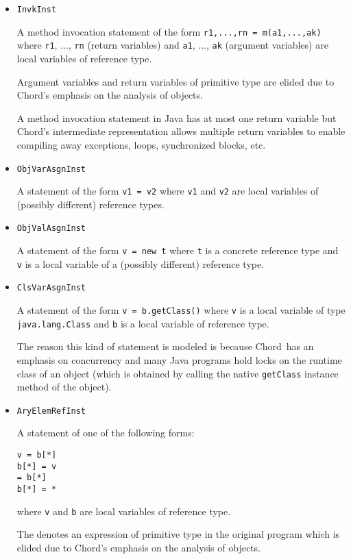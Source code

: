 \documentclass{article}
\providecommand\Chord{{Chord}}
\begin{document}
\begin{itemize}
\item
{\tt InvkInst}

A method invocation statement of the form
{\tt r1,...,rn = m(a1,...,ak)} where
{\tt r1}, ..., {\tt rn} (return variables) and
{\tt a1}, ..., {\tt ak} (argument variables)
are local variables of reference type.

Argument variables and return variables of primitive type are
elided due to \Chord's emphasis on the analysis of objects.

A method invocation statement in Java has at most
one return variable but
\Chord's intermediate representation allows multiple return variables
to enable compiling away exceptions, loops, synchronized blocks, etc.

\item
{\tt ObjVarAsgnInst}

A statement of the form {\tt v1 = v2} where {\tt v1}
and {\tt v2} are local variables of (possibly different) reference types.

\item
{\tt ObjValAsgnInst}

A statement of the form {\tt v = new t} where {\tt t} is a
concrete reference type and
{\tt v} is a local variable of a (possibly different) reference type.

\item
{\tt ClsVarAsgnInst}

A statement of the form {\tt v = b.getClass()} where
{\tt v} is a local variable of type {\tt java.lang.Class}
and {\tt b} is a local variable of reference type.

The reason this kind of statement is modeled is because
\Chord\ has an emphasis on concurrency and many Java programs
hold locks on the runtime class of an object
(which is obtained by calling the native {\tt getClass}
instance method of the object).

\item
{\tt AryElemRefInst}

A statement of one of the following forms:

{\tt v = b[*]}  \\
{\tt b[*] = v} \\
{\tt * = b[*]} \\
{\tt b[*] = *}

where {\tt v} and {\tt b} are local variables of reference
type.

The {\tt *} denotes an expression of primitive type in the
original program which is elided due to \Chord's emphasis on the
analysis of objects.
\end{itemize}
\end{document}
